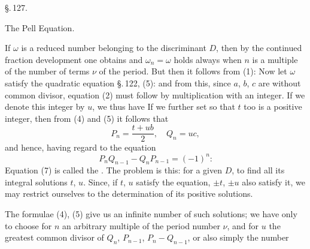 \begin{center}
\S.\,127.

The Pell Equation.
\end{center}

If $\omega$ is a reduced number belonging to the discriminant $D$, then
by the continued fraction development one obtains
and $\omega_n = \omega$ holds always when $n$ is a multiple of the
number of terms $\nu$ of the period. But then it follows from (1):
Now let $\omega$ satisfy the quadratic equation \S.\,122, (5):
and from this, since $a$, $b$, $c$ are without common divisor,
equation (2) must follow by multiplication with an integer.
If we denote this integer by $u$, we thus have
If we further set
so that $t$ too is a positive integer, then from (4) and (5) it follows that
\[
P_n = \frac{t + u b}{2}, \quad Q_n = u c,
\]
and hence, having regard to the equation
\[
P_n Q_{n-1} - Q_n P_{n-1} = (-1)^n\text{:}
\]
Equation (7) is called the . The
problem is this: for a given $D$, to find all its integral
solutions $t$, $u$. Since, if $t$, $u$ satisfy the equation,
$\pm t$, $\pm u$ also satisfy it, we may restrict ourselves to the determination
of its positive solutions.

The formulae (4), (5) give us an infinite number of such
solutions; we have only to choose for $n$ an arbitrary multiple of the
period number $\nu$, and for $u$ the greatest common
divisor of $Q_n$, $P_{n-1}$, $P_n - Q_{n-1}$, or also simply the number
